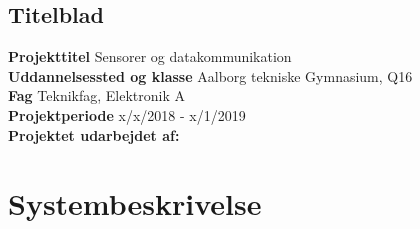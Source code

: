 \documentclass[12pt]{article}
\begin{document}


\subsection*{Titelblad}
\textbf{Projekttitel} Sensorer og datakommunikation\\
\textbf{Uddannelsessted og klasse} Aalborg tekniske Gymnasium, Q16\\
\textbf{Fag} Teknikfag, Elektronik A\\
\textbf{Projektperiode} x/x/2018 - x/1/2019\\
\textbf{Projektet udarbejdet af:}\\






\renewcommand{\contentsname}{Indholdsfortegnelse}
\tableofcontents
\newpage


\newpage


\newpage


\section{Systembeskrivelse}


\newpage


\newpage


\newpage


\newpage


\end{document}
